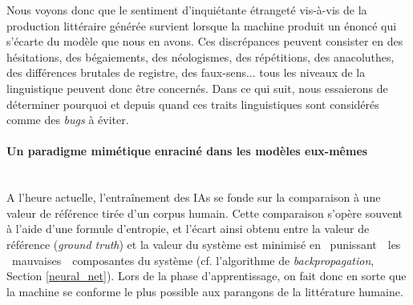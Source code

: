 \documentclass{article}
\newcommand{\subsubsubsection}[1]{\paragraph{#1}\mbox{}\\}
\begin{document}
					
					Nous voyons donc que le sentiment d'inquiétante étrangeté vis-à-vis de la production littéraire générée survient lorsque la machine produit un énoncé qui s'écarte du modèle que nous en avons. Ces discrépances peuvent consister en des hésitations, des bégaiements, des néologismes, des répétitions, des anacoluthes, des différences brutales de registre, des faux-sens... tous les niveaux de la linguistique peuvent donc être concernés. Dans ce qui suit, nous essaierons de déterminer pourquoi et depuis quand ces traits linguistiques sont considérés comme des \textit{bugs} à éviter.
					
				\subsubsubsection{Un paradigme mimétique enraciné dans les modèles eux-mêmes}
					
					A l'heure actuelle, l'entraînement des IAs se fonde sur la comparaison à une valeur de référence tirée d'un corpus humain. Cette comparaison s'opère souvent à l'aide d'une formule d'entropie, et l'écart ainsi obtenu entre la valeur de référence (\textit{ground truth}) et la valeur du système est minimisé en \guillemotleft~punissant~\guillemotright~les \guillemotleft~mauvaises~\guillemotright~composantes du système (cf. l'algorithme de \textit{backpropagation}, Section \ref{neural_net}). Lors de la phase d'apprentissage, on fait donc en sorte que la machine se conforme le plus possible aux parangons de la littérature humaine.\\
				
\end{document}
